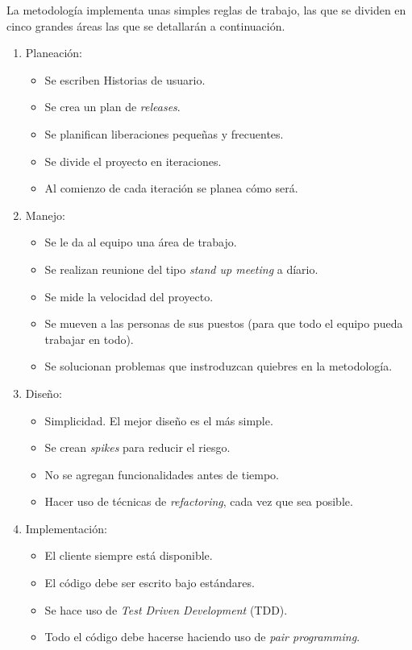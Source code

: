 La metodología implementa unas simples reglas de trabajo, las que se dividen en cinco grandes áreas las que se detallarán a continuación.

\begin{enumerate}
\item Planeación:
	\begin{itemize}
	\item Se escriben Historias de usuario. 
	\item Se crea un plan de \textit{releases}.
	\item Se planifican liberaciones pequeñas y frecuentes.
	\item Se divide el proyecto en iteraciones.
	\item Al comienzo de cada iteración se planea cómo será.
	\end{itemize}
\item Manejo:
	\begin{itemize}
	\item Se le da al equipo una área de trabajo.
	\item Se realizan reunione del tipo \textit{stand up meeting} a díario.
	\item Se mide la velocidad del proyecto. 
	\item Se mueven a las personas de sus puestos (para que todo el equipo pueda trabajar en todo).
	\item Se solucionan problemas que instroduzcan quiebres en la metodología.
	\end{itemize}
\item Diseño:
	\begin{itemize}
	\item Simplicidad. El mejor diseño es el más simple.
	\item Se crean \textit{spikes} para reducir el riesgo.
	\item No se agregan funcionalidades antes de tiempo.
	\item Hacer uso de técnicas de \textit{refactoring}, cada vez que sea posible.
	\end{itemize}
\item Implementación:
	\begin{itemize}
	\item El cliente siempre está disponible. 
	\item El código debe ser escrito bajo estándares. 
	\item Se hace uso de \textit{Test Driven Development }(TDD).
	\item Todo el código debe hacerse haciendo uso de \textit{pair programming}.

\end{itemize}
\end{enumerate}
